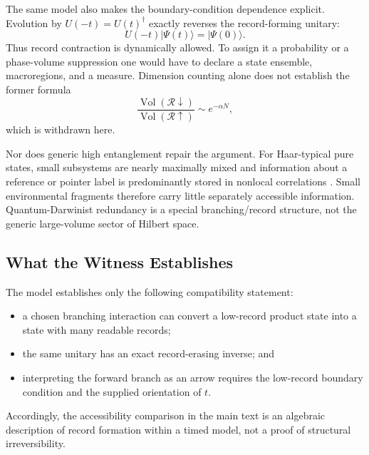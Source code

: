 \documentclass[12pt,a4paper]{article}
\begin{document}
The same model also makes the boundary-condition dependence explicit.  Evolution by $U(-t)=U(t)^\dagger$ exactly reverses the record-forming unitary:
\begin{equation}
U(-t)|\Psi(t)\rangle=|\Psi(0)\rangle.
\end{equation}
Thus record contraction is dynamically allowed.  To assign it a probability or a phase-volume suppression one would have to declare a state ensemble, macroregions, and a measure.  Dimension counting alone does not establish the former formula
\begin{equation}
\frac{\operatorname{Vol}(\mathcal R\downarrow)}
{\operatorname{Vol}(\mathcal R\uparrow)}\sim e^{-\alpha N},
\end{equation}
which is withdrawn here.

Nor does generic high entanglement repair the argument.  For Haar-typical pure states, small subsystems are nearly maximally mixed and information about a reference or pointer label is predominantly stored in nonlocal correlations \cite{Page1993,HaydenPreskill2007}.  Small environmental fragments therefore carry little separately accessible information.  Quantum-Darwinist redundancy is a special branching/record structure, not the generic large-volume sector of Hilbert space.

\subsection{What the Witness Establishes}

The model establishes only the following compatibility statement:
\begin{itemize}
    \item a chosen branching interaction can convert a low-record product state into a state with many readable records;
    \item the same unitary has an exact record-erasing inverse; and
    \item interpreting the forward branch as an arrow requires the low-record boundary condition and the supplied orientation of $t$.
\end{itemize}
Accordingly, the accessibility comparison in the main text is an algebraic description of record formation within a timed model, not a proof of structural irreversibility.
\end{document}
